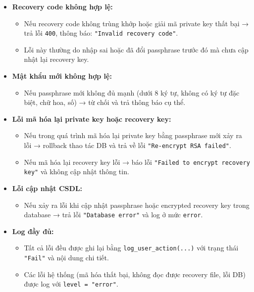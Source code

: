 \begin{description}
\begin{itemize}
        \item \textbf{Recovery code không hợp lệ:}
        \begin{itemize}
            \item Nếu recovery code không trùng khớp hoặc giải mã private key thất bại → trả lỗi \texttt{400}, thông báo: \texttt{"Invalid recovery code"}.
            \item Lỗi này thường do nhập sai hoặc đã đổi passphrase trước đó mà chưa cập nhật lại recovery key.
        \end{itemize}

        \item \textbf{Mật khẩu mới không hợp lệ:}
        \begin{itemize}
            \item Nếu passphrase mới không đủ mạnh (dưới 8 ký tự, không có ký tự đặc biệt, chữ hoa, số) → từ chối và trả thông báo cụ thể.
        \end{itemize}

        \item \textbf{Lỗi mã hóa lại private key hoặc recovery key:}
        \begin{itemize}
            \item Nếu trong quá trình mã hóa lại private key bằng passphrase mới xảy ra lỗi → rollback thao tác DB và trả về lỗi \texttt{"Re-encrypt RSA failed"}.
            \item Nếu mã hóa lại recovery key lỗi → báo lỗi \texttt{"Failed to encrypt recovery key"} và không cập nhật thông tin.
        \end{itemize}

        \item \textbf{Lỗi cập nhật CSDL:}
        \begin{itemize}
            \item Nếu xảy ra lỗi khi cập nhật passphrase hoặc encrypted recovery key trong database → trả lỗi \texttt{"Database error"} và log ở mức \texttt{error}.
        \end{itemize}

        \item \textbf{Log đầy đủ:}
        \begin{itemize}
            \item Tất cả lỗi đều được ghi lại bằng \texttt{log\_user\_action(...)} với trạng thái \texttt{"Fail"} và nội dung chi tiết.
            \item Các lỗi hệ thống (mã hóa thất bại, không đọc được recovery file, lỗi DB) được log với \texttt{level = "error"}.
        \end{itemize}
    \end{itemize}


\end{description}
